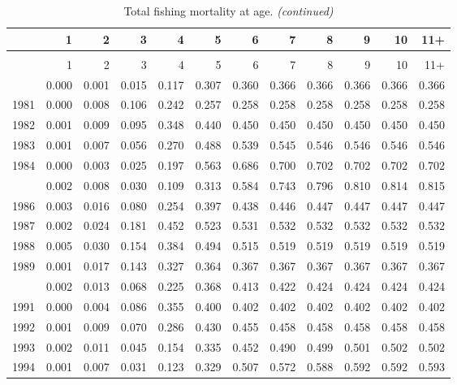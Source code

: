 \documentclass[
]{article}
\begin{document}
\begin{longtable}[t]{lrrrrrrrrrrr}
\caption{\label{tab:FAA-tot-table}Total fishing mortality at age.}\\
\toprule
  & 1 & 2 & 3 & 4 & 5 & 6 & 7 & 8 & 9 & 10 & 11+\\
\midrule
\endfirsthead
\caption[]{Total fishing mortality at age. \textit{(continued)}}\\
\toprule
  & 1 & 2 & 3 & 4 & 5 & 6 & 7 & 8 & 9 & 10 & 11+\\
\midrule
\endhead

\endfoot
\bottomrule
\endlastfoot
1980 & 0.000 & 0.001 & 0.015 & 0.117 & 0.307 & 0.360 & 0.366 & 0.366 & 0.366 & 0.366 & 0.366\\
1981 & 0.000 & 0.008 & 0.106 & 0.242 & 0.257 & 0.258 & 0.258 & 0.258 & 0.258 & 0.258 & 0.258\\
1982 & 0.001 & 0.009 & 0.095 & 0.348 & 0.440 & 0.450 & 0.450 & 0.450 & 0.450 & 0.450 & 0.450\\
1983 & 0.001 & 0.007 & 0.056 & 0.270 & 0.488 & 0.539 & 0.545 & 0.546 & 0.546 & 0.546 & 0.546\\
1984 & 0.000 & 0.003 & 0.025 & 0.197 & 0.563 & 0.686 & 0.700 & 0.702 & 0.702 & 0.702 & 0.702\\
\addlinespace
1985 & 0.002 & 0.008 & 0.030 & 0.109 & 0.313 & 0.584 & 0.743 & 0.796 & 0.810 & 0.814 & 0.815\\
1986 & 0.003 & 0.016 & 0.080 & 0.254 & 0.397 & 0.438 & 0.446 & 0.447 & 0.447 & 0.447 & 0.447\\
1987 & 0.002 & 0.024 & 0.181 & 0.452 & 0.523 & 0.531 & 0.532 & 0.532 & 0.532 & 0.532 & 0.532\\
1988 & 0.005 & 0.030 & 0.154 & 0.384 & 0.494 & 0.515 & 0.519 & 0.519 & 0.519 & 0.519 & 0.519\\
1989 & 0.001 & 0.017 & 0.143 & 0.327 & 0.364 & 0.367 & 0.367 & 0.367 & 0.367 & 0.367 & 0.367\\
\addlinespace
1990 & 0.002 & 0.013 & 0.068 & 0.225 & 0.368 & 0.413 & 0.422 & 0.424 & 0.424 & 0.424 & 0.424\\
1991 & 0.000 & 0.004 & 0.086 & 0.355 & 0.400 & 0.402 & 0.402 & 0.402 & 0.402 & 0.402 & 0.402\\
1992 & 0.001 & 0.009 & 0.070 & 0.286 & 0.430 & 0.455 & 0.458 & 0.458 & 0.458 & 0.458 & 0.458\\
1993 & 0.002 & 0.011 & 0.045 & 0.154 & 0.335 & 0.452 & 0.490 & 0.499 & 0.501 & 0.502 & 0.502\\
1994 & 0.001 & 0.007 & 0.031 & 0.123 & 0.329 & 0.507 & 0.572 & 0.588 & 0.592 & 0.592 & 0.593\\

\end{longtable}
\end{document}
